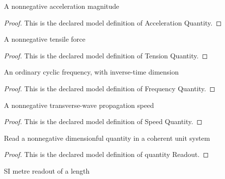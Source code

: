 \begin{definition}
  \label{def:physics:phyx-mini-0299:phyxminiproblems-problemphyxmini0299-accelerationquantity}
  A nonnegative acceleration magnitude
\end{definition}
\begin{proof}
  This is the declared model definition of Acceleration Quantity.
\end{proof}
\begin{definition}
  \label{def:physics:phyx-mini-0299:phyxminiproblems-problemphyxmini0299-tensionquantity}
  A nonnegative tensile force
\end{definition}
\begin{proof}
  This is the declared model definition of Tension Quantity.
\end{proof}
\begin{definition}
  \label{def:physics:phyx-mini-0299:phyxminiproblems-problemphyxmini0299-frequencyquantity}
  An ordinary cyclic frequency, with inverse-time dimension
\end{definition}
\begin{proof}
  This is the declared model definition of Frequency Quantity.
\end{proof}
\begin{definition}
  \label{def:physics:phyx-mini-0299:phyxminiproblems-problemphyxmini0299-speedquantity}
  A nonnegative transverse-wave propagation speed
\end{definition}
\begin{proof}
  This is the declared model definition of Speed Quantity.
\end{proof}
\begin{definition}
  \label{def:physics:phyx-mini-0299:phyxminiproblems-problemphyxmini0299-quantityreadout}
  Read a nonnegative dimensionful quantity in a coherent unit system
\end{definition}
\begin{proof}
  This is the declared model definition of quantity Readout.
\end{proof}
\begin{definition}
  \label{def:physics:phyx-mini-0299:phyxminiproblems-problemphyxmini0299-lengthinmeters}
  SI metre readout of a length
\end{definition}
